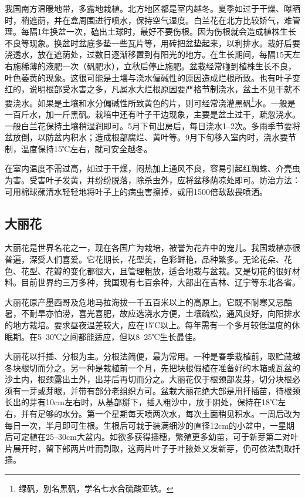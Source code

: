 \documentclass{ctexbook}
\begin{document}
我国南方温暖地带，多露地栽植。北方地区都是室内越冬。夏季如过于干燥、曝晒时，稍遮荫，并在盒周围进行喷水，保持空气湿度。白兰花在北方比较娇气，难管理。每隔1年换盆一次，磕出土球时，最好不要伤根。因为伤根就会造成植株生长不良等现象。换盆时盆底多垫一些瓦片等，用砖把盆垫起来，以利排水。栽好后要浇透水，放在遮荫处，过数日逐渐移置到有阳光的地方。在生长期间，每隔15天左右施稀薄的液肥一次（矾肥水），立秋后停止施肥。盆栽经常碰到植株生长不良，叶色萎黄的现象。这很可能是土壤与浇水偏碱性的原因造成烂根所致。也有叶子变红的，说明根部受水害之多，凡属水大烂根原因要严格节制浇水，盆土不见干就不要浇水。如果是土壤和水分偏碱性所致黄色的片，则可经常浇灌黑矾\footnote{绿矾，别名黑矾，学名七水合硫酸亚铁。}水。一般是一百斤水，加一斤黑矾。栽培中还有叶子干边现象，主要是盆土过干，疏忽浇水。一般白兰花保持土壤稍湿润即可。5月下旬出房后，每日浇水1--2次。多雨季节要将盆放倒，以防盆内积水；造成根部腐烂、黄叶等。9月下旬移入室内时，浇水要节制，温度保持15℃左右，就可安全越冬。

在室内温度不需过高，如过于干燥，闷热加上通风不良，容易引起红蜘蛛、介壳虫为害。受害叶子发黄，并纷纷脱落，除杀虫外，应将盆移荫凉处即可。防治方法：可用棉球蘸清水轻轻地将叶子上的病虫害擦掉，或用1500倍敌敌畏喷洒。

\subsection{大丽花}
大丽花是世界名花之一，现在各国广为栽培，被誉为花卉中的宠儿。我国栽植亦很普遍，深受人们喜爱。它花期长，花型美，色彩鲜艳，品种繁多。无论花朵、花色、花型、花瓣的变化都很大，且管理粗放，适合地栽与盆栽。又是切花的很好材料。目前世界约三万多种，我国现有七百余种，大部出在吉林、辽宁等东北各省。

大丽花原产墨西哥及危地马拉海拔一千五百米以上的高原上。它既不耐寒又忌酷暑，不耐旱亦怕涝，喜光喜肥，故应选浇水方便，土壤疏松，通风良好，向阳排水的地方栽培。要求昼夜温差较大，应在15℃以上。每年需有一个多月较低温度的休眠期。在5--30℃之间都能适应，但以8--25℃生长最佳。

大丽花以扦插、分根为主。分根法简便，最为常用。一种是春季栽植前，取贮藏越冬块根切而分之。另一种是栽植前一个月，先把块根假植在准备好的木箱或瓦盆的沙土内，根颈露出土外，出芽后再切而分之。大丽花仅于根颈部发芽，切分块根必须有一芽或芽眼，并带有部分老组织方可。盆栽大丽花绝大部是用扦插苗，待根颈长出的芽有10cm左右时，从基部掰下，插入粗沙中，放于阴处，保持在18℃左右，并有足够的水分。第一个星期每天喷两次水，每次土面稍见积水。一周后改为每日一次，半月即可生根。生根后可栽于装满细沙的直径12cm的小盆中，一星期后可定植在25--30cm大盆内。如欲多获得插穗，繁殖更多幼苗，可于新芽第二对叶片展开时，留下部两片叶而割取，这两片叶子于叶腋处又发新芽，仍可依法割取扦插。
\end{document}
